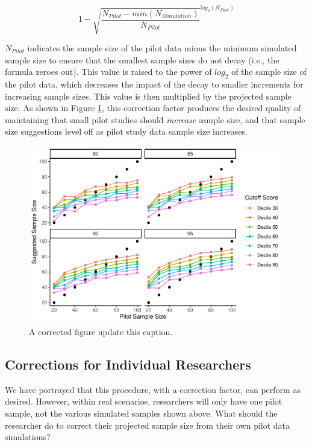 \documentclass[
  man]{apa6}
\begin{document}
\[ 1 - \sqrt{\frac{N_{Pilot} - min(N_{Simulation})}{N_{Pilot}}}^{log_2(N_{Pilot})}\]

\(N_{Pilot}\) indicates the sample size of the pilot data minus the minimum simulated sample size to ensure that the smallest sample sizes do not decay (i.e., the formula zeroes out). This value is raised to the power of \(log_2\) of the sample size of the pilot data, which decreases the impact of the decay to smaller increments for increasing sample sizes. This value is then multiplied by the projected sample size. As shown in Figure \ref{fig:corrected-figure}, this correction factor produces the desired quality of maintaining that small pilot studies should \emph{increase} sample size, and that sample size suggestions level off as pilot study data sample size increases.

\begin{figure}
\centering
\includegraphics{manuscript_draft_files/figure-latex/corrected-figure-1.pdf}
\caption{\label{fig:corrected-figure}A corrected figure update this caption.}
\end{figure}

\hypertarget{corrections-for-individual-researchers}{%
\subsection{Corrections for Individual Researchers}\label{corrections-for-individual-researchers}}

We have portrayed that this procedure, with a correction factor, can perform as desired. However, within real scenarios, researchers will only have one pilot sample, not the various simulated samples shown above. What should the researcher do to correct their projected sample size from their own pilot data simulations?
\end{document}
